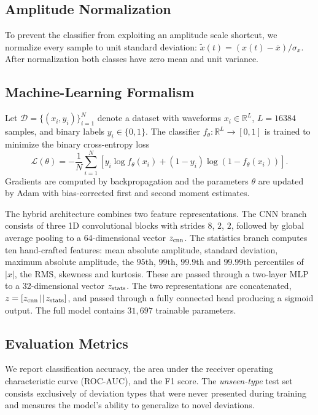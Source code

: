 \subsection{Amplitude Normalization}

To prevent the classifier from exploiting an amplitude scale shortcut,
we normalize every sample to unit standard deviation:
$\tilde{x}(t) = (x(t) - \overline{x}) / \sigma_x$. After normalization
both classes have zero mean and unit variance.

\subsection{Machine-Learning Formalism}

Let $\mathcal{D} = \{(x_i, y_i)\}_{i=1}^{N}$ denote a dataset with
waveforms $x_i \in \mathbb{R}^{L}$, $L = 16384$ samples, and binary
labels $y_i \in \{0, 1\}$. The classifier
$f_\theta: \mathbb{R}^L \to [0, 1]$ is trained to minimize the binary
cross-entropy loss
\begin{equation}
    \mathcal{L}(\theta) = -\frac{1}{N} \sum_{i=1}^{N}
    \left[ y_i \log f_\theta(x_i)
    + (1 - y_i) \log(1 - f_\theta(x_i)) \right].
\end{equation}
Gradients are computed by backpropagation and the parameters $\theta$
are updated by Adam with bias-corrected first and second moment
estimates.

The hybrid architecture combines two feature representations. The CNN
branch consists of three 1D convolutional blocks with strides $8$, $2$,
$2$, followed by global average pooling to a 64-dimensional vector
$z_{\rm cnn}$. The statistics branch computes ten hand-crafted features:
mean absolute amplitude, standard deviation, maximum absolute
amplitude, the $95$th, $99$th, $99.9$th and $99.99$th percentiles of
$|x|$, the RMS, skewness and kurtosis. These are passed through a
two-layer MLP to a 32-dimensional vector $z_{\rm stats}$. The two
representations are concatenated, $z = [z_{\rm cnn} \,||\, z_{\rm stats}]$,
and passed through a fully connected head producing a sigmoid output.
The full model contains $31{,}697$ trainable parameters.

\subsection{Evaluation Metrics}

We report classification accuracy, the area under the receiver
operating characteristic curve (ROC-AUC), and the F1 score. The
\emph{unseen-type} test set consists exclusively of deviation types
that were never presented during training and measures the model's
ability to generalize to novel deviations.
